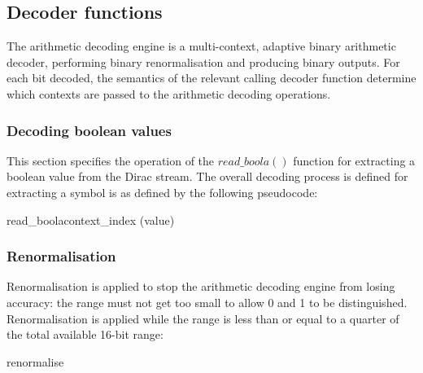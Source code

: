 \subsection{Decoder functions}
\label{extractarith}
The arithmetic decoding engine is a multi-context, adaptive binary
arithmetic decoder, performing binary renormalisation and producing
binary outputs. For each bit decoded, the semantics of the relevant
calling decoder function determine which contexts are passed to the
arithmetic decoding operations.

\subsubsection{Decoding boolean values}

\label{arithreadbool}

This section specifies the operation of the $read\_boola()$ function
for extracting a boolean value from the Dirac stream. The overall decoding
process is defined for extracting a symbol is as defined by the following
pseudocode:

\begin{pseudo}{read\_boola}{context\_index}
\bsELSE
\bsEND
{}
\bsEND
\bsRET(value)
\end{pseudo}

\begin{informative}
\end{informative}

\subsubsection{Renormalisation}
\label{renormalisation}

Renormalisation is applied to stop the arithmetic decoding engine from losing accuracy: the range
must not get too small to allow 0 and 1 to be distinguished. Renormalisation is applied while the
range is less than or equal to a quarter of the total available 16-bit  range:

\begin{pseudo}{renormalise}{}
    \bsEND
\bsEND
\end{pseudo}

